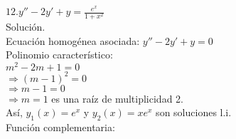 \documentclass{beamer}
\begin{document}
    \begin{frame}
        $ 12. y'' - 2y' + y = \frac{e^x}{1+x^2} $ \\
        Solución. \\
        Ecuación homogénea asociada: $ y'' - 2y' + y = 0 $ \\
        Polinomio característico: \\
        $ m^2 - 2m + 1 = 0 $ \\
        $ \Longrightarrow (m - 1)^2 = 0 $ \\
        $ \Longrightarrow m - 1 = 0 $ \\
        $ \Longrightarrow m = 1 $ es una raíz de multiplicidad 2. \\
        Así, $ y_1(x) = e^x $ y $ y_2(x) = xe^x $ son soluciones l.i. \\
        Función complementaria:
    \end{frame}
\end{document}
